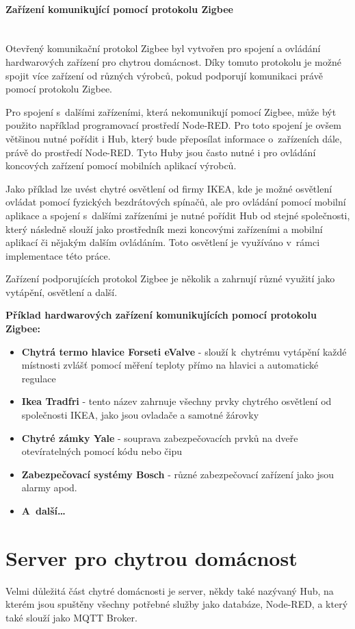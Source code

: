\paragraph*{Zařízení komunikující pomocí protokolu Zigbee}\mbox{} \\
Otevřený komunikační protokol Zigbee byl vytvořen pro spojení a ovládání hardwarových zařízení pro chytrou domácnost. Díky tomuto protokolu je možné spojit více zařízení od různých výrobců, pokud podporují komunikaci právě pomocí protokolu Zigbee.

Pro spojení s~dalšími zařízeními, která nekomunikují pomocí Zigbee, může být použito například programovací prostředí Node-RED. Pro toto spojení je ovšem většinou nutné pořídit i Hub, který bude přeposílat informace o~zařízeních dále, právě do prostředí Node-RED. Tyto Huby jsou často nutné i pro ovládání koncových zařízení pomocí mobilních aplikací výrobců. 

Jako příklad lze uvést chytré osvětlení od firmy IKEA, kde je možné osvětlení ovládat pomocí fyzických bezdrátových spínačů, ale pro ovládání pomocí mobilní aplikace a spojení s~dalšími zařízeními je nutné pořídit Hub od stejné společnosti, který následně slouží jako prostředník mezi koncovými zařízeními a mobilní aplikací či nějakým dalším ovládáním. Toto osvětlení je využíváno v~rámci implementace této práce.

Zařízení podporujících protokol Zigbee je několik a zahrnují různé využití jako vytápění, osvětlení a další. 

\noindent\textbf{Příklad hardwarových zařízení komunikujících pomocí protokolu Zigbee\cite{zigbee-info}:}
\begin{itemize}
  \item \textbf{Chytrá termo hlavice Forseti eValve} - slouží k~chytrému vytápění každé místnosti zvlášť pomocí měření teploty přímo na hlavici a automatické regulace
  \item \textbf{Ikea Tradfri} - tento název zahrnuje všechny prvky chytrého osvětlení od společnosti IKEA, jako jsou ovladače a samotné žárovky
  \item \textbf{Chytré zámky Yale} - souprava zabezpečovacích prvků na dveře otevíratelných pomocí kódu nebo čipu
  \item \textbf{Zabezpečovací systémy Bosch} - různé zabezpečovací zařízení jako jsou alarmy apod.
  \item \textbf{A~další…}
  \end{itemize}

\section{Server pro chytrou domácnost}
Velmi důležitá část chytré domácnosti je server, někdy také nazývaný Hub, na kterém jsou spuštěny všechny potřebné služby jako databáze, Node-RED, a který také slouží jako MQTT Broker. 

